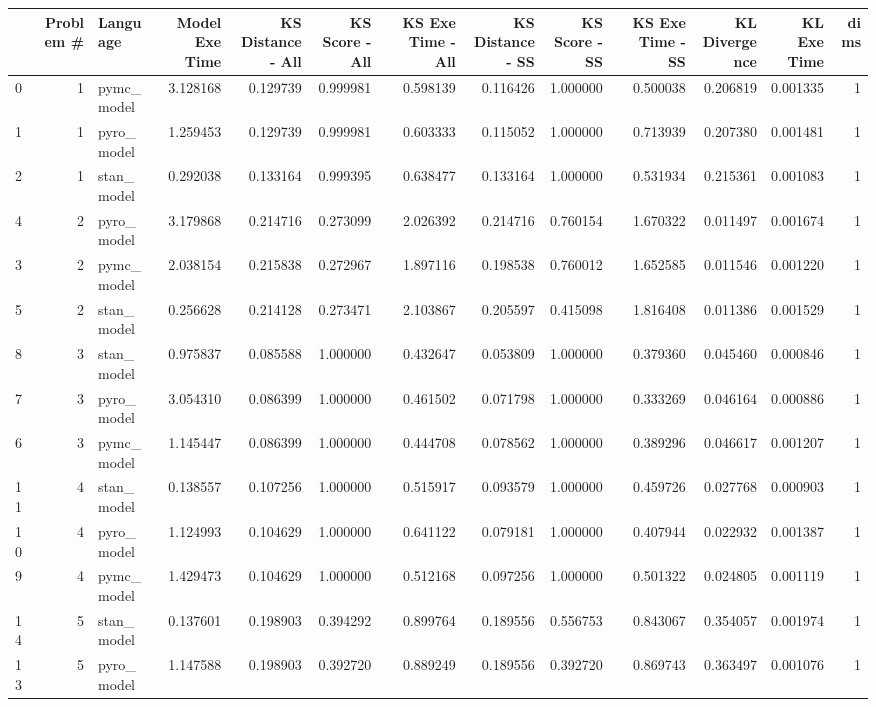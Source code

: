 \begin{tabular}{lrlrrrrrrrrrr}
\toprule
 & Problem # & Language & Model Exe Time & KS Distance - All & KS Score - All & KS Exe Time - All & KS Distance - SS & KS Score - SS & KS Exe Time - SS & KL Divergence & KL Exe Time & dims \\
\midrule
0 & 1 & pymc_model & 3.128168 & 0.129739 & 0.999981 & 0.598139 & 0.116426 & 1.000000 & 0.500038 & 0.206819 & 0.001335 & 1 \\
1 & 1 & pyro_model & 1.259453 & 0.129739 & 0.999981 & 0.603333 & 0.115052 & 1.000000 & 0.713939 & 0.207380 & 0.001481 & 1 \\
2 & 1 & stan_model & 0.292038 & 0.133164 & 0.999395 & 0.638477 & 0.133164 & 1.000000 & 0.531934 & 0.215361 & 0.001083 & 1 \\
4 & 2 & pyro_model & 3.179868 & 0.214716 & 0.273099 & 2.026392 & 0.214716 & 0.760154 & 1.670322 & 0.011497 & 0.001674 & 1 \\
3 & 2 & pymc_model & 2.038154 & 0.215838 & 0.272967 & 1.897116 & 0.198538 & 0.760012 & 1.652585 & 0.011546 & 0.001220 & 1 \\
5 & 2 & stan_model & 0.256628 & 0.214128 & 0.273471 & 2.103867 & 0.205597 & 0.415098 & 1.816408 & 0.011386 & 0.001529 & 1 \\
8 & 3 & stan_model & 0.975837 & 0.085588 & 1.000000 & 0.432647 & 0.053809 & 1.000000 & 0.379360 & 0.045460 & 0.000846 & 1 \\
7 & 3 & pyro_model & 3.054310 & 0.086399 & 1.000000 & 0.461502 & 0.071798 & 1.000000 & 0.333269 & 0.046164 & 0.000886 & 1 \\
6 & 3 & pymc_model & 1.145447 & 0.086399 & 1.000000 & 0.444708 & 0.078562 & 1.000000 & 0.389296 & 0.046617 & 0.001207 & 1 \\
11 & 4 & stan_model & 0.138557 & 0.107256 & 1.000000 & 0.515917 & 0.093579 & 1.000000 & 0.459726 & 0.027768 & 0.000903 & 1 \\
10 & 4 & pyro_model & 1.124993 & 0.104629 & 1.000000 & 0.641122 & 0.079181 & 1.000000 & 0.407944 & 0.022932 & 0.001387 & 1 \\
9 & 4 & pymc_model & 1.429473 & 0.104629 & 1.000000 & 0.512168 & 0.097256 & 1.000000 & 0.501322 & 0.024805 & 0.001119 & 1 \\
14 & 5 & stan_model & 0.137601 & 0.198903 & 0.394292 & 0.899764 & 0.189556 & 0.556753 & 0.843067 & 0.354057 & 0.001974 & 1 \\
13 & 5 & pyro_model & 1.147588 & 0.198903 & 0.392720 & 0.889249 & 0.189556 & 0.392720 & 0.869743 & 0.363497 & 0.001076 & 1 \\

\end{tabular}
